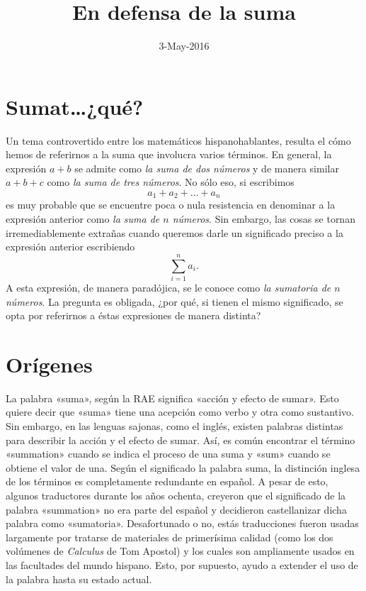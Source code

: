 \documentclass[draft,letter,10pt,notitlepage]{article}
\title{En defensa de la suma}
\date{3-May-2016}
\theoremstyle{definition}
\theoremstyle{remark}
\begin{document}
\maketitle
\section{Sumat\dots ¿qué?}
Un tema controvertido entre los matemáticos hispanohablantes, 
resulta el cómo hemos de referirnos a la suma que involucra varios términos.
En general, la expresión \( a + b\) se admite como \emph{la suma de dos números}
y de manera similar  \( a + b + c\) como \emph{la suma de tres números}. 
No sólo eso, si escribimos
\[ a_1 + a_2 + \dots + a_n\]
es muy probable que se encuentre poca o nula resistencia en
denominar a la expresión anterior como \emph{la suma de \( n\) números}.
Sin embargo, las cosas se tornan irremediablemente extrañas cuando 
queremos darle un significado preciso a la expresión anterior escribiendo
\[ \sum_{i=1}^n a_i.\]
A esta expresión, de manera paradójica, se le conoce como
\emph{la sumatoria de \( n\) números}. La pregunta es obligada, ¿por qué, si
tienen el mismo significado, se opta por referirnos a éstas expresiones de 
manera distinta?

\section{Orígenes}

La palabra «suma», según la RAE significa «acción y efecto de
sumar». Esto quiere decir que «suma» tiene una acepción como verbo y
otra como sustantivo. Sin embargo, en las lenguas sajonas, como el
inglés, existen palabras distintas para describir la acción y el
efecto de sumar. Así, es común encontrar el término «summation» cuando
se indica el proceso de una suma y «sum» cuando se obtiene el valor de
una. Según el significado la palabra suma, la distinción inglesa de
los términos es completamente redundante en español. A pesar de esto,
algunos traductores durante los años ochenta, creyeron que el
significado de la palabra «summation» no era parte del español y
decidieron castellanizar dicha palabra como «sumatoria». Desafortunado
o no, estás traducciones fueron usadas largamente por tratarse de
materiales de primerísima calidad (como los dos volúmenes de
\textit{Calculus} de Tom Apostol) y los cuales son ampliamente
usados en las facultades del mundo hispano. Esto, por supuesto, ayudo
a extender el uso de la palabra hasta su estado actual.
\end{document}

